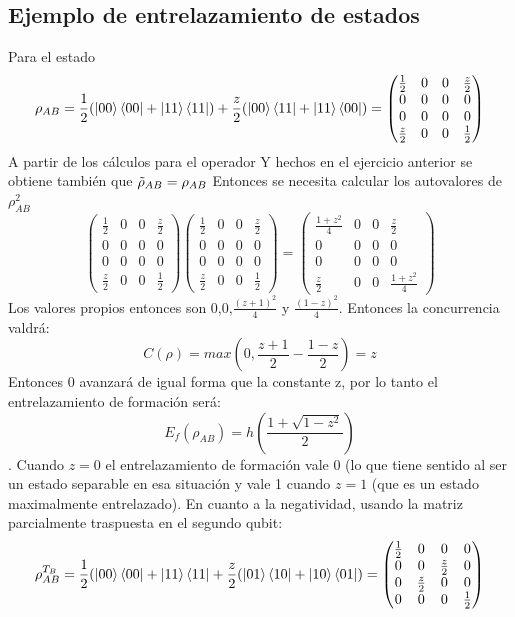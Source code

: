 \documentclass{book}
\begin{document}
\subsection{Ejemplo de entrelazamiento de estados} Para el estado $$\rho_{AB}=\frac{1}{2}(\ket{00}\bra{00}+\ket{11}\bra{11})+\frac{z}{2}(\ket{00}\bra{11}+\ket{11}\bra{00})=\begin{pmatrix}\frac{1}{2}&0&0&\frac{z}{2}\\0&0&0&0\\0&0&0&0\\ \frac{z}{2}&0&0&\frac{1}{2}\end{pmatrix}$$ A partir de los cálculos para el operador Y hechos en el ejercicio anterior se obtiene también que  $\Tilde{\rho}_{AB}=\rho_{AB}$ Entonces se necesita calcular los autovalores de $\rho_{AB}^2$
$$\begin{pmatrix}\frac{1}{2}&0&0&\frac{z}{2}\\0&0&0&0\\0&0&0&0\\ \frac{z}{2}&0&0&\frac{1}{2}\end{pmatrix}\begin{pmatrix}\frac{1}{2}&0&0&\frac{z}{2}\\0&0&0&0\\0&0&0&0\\ \frac{z}{2}&0&0&\frac{1}{2}\end{pmatrix}=\begin{pmatrix}\frac{1+z^2}{4}&0&0&\frac{z}{2}\\0&0&0&0\\0&0&0&0\\ \frac{z}{2}&0&0&\frac{1+z^2}{4}\end{pmatrix}$$ Los valores propios entonces son $0$,$0$,$\frac{(z+1)^2}{4}$ y $\frac{(1-z)^2}{4}$. Entonces la concurrencia valdrá: 
$$C(\rho)=max(0,\frac{z+1}{2}-\frac{1-z}{2})=z$$ Entonces 0 avanzará de igual forma que la constante z, por lo tanto el entrelazamiento de formación será: $$E_f(\rho_{AB})=h(\frac{1+\sqrt{1-z^2}}{2})$$. Cuando $z=0$ el entrelazamiento de formación vale 0 (lo que tiene sentido al ser un estado separable en esa situación y vale 1 cuando $z=1$ (que es un estado maximalmente entrelazado). En cuanto a la negatividad, usando la matriz parcialmente traspuesta en el segundo qubit:
$$\rho_{AB}^{T_B}=\frac{1}{2}(\ket{00}\bra{00}+\ket{11}\bra{11}+\frac{z}{2}(\ket{01}\bra{10}+\ket{10}\bra{01})=\begin{pmatrix}\frac{1}{2}&0&0&0\\0&0&\frac{z}{2}&0\\0&\frac{z}{2}&0&0\\0&0&0&\frac{1}{2}\end{pmatrix}$$
\end{document}
